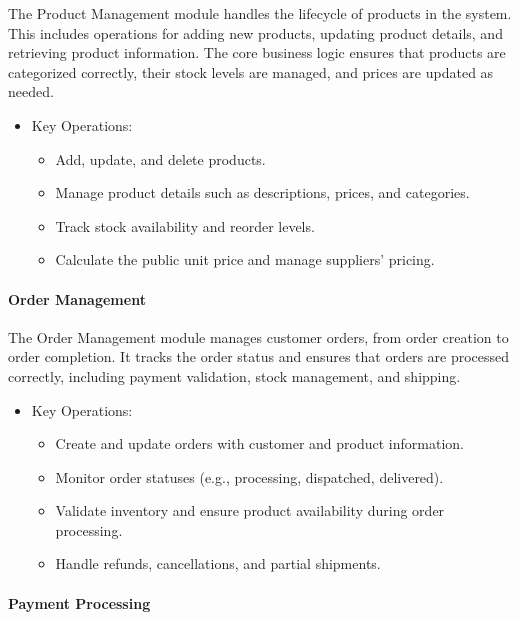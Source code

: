 \documentclass{llncs}
\begin{document}
The Product Management module handles the lifecycle of products in the system. This includes operations for adding new products, updating product details, and retrieving product information. The core business logic ensures that products are categorized correctly, their stock levels are managed, and prices are updated as needed.
    \begin{itemize}
        \item Key Operations:
        \begin{itemize}
        \item Add, update, and delete products.
        \item Manage product details such as descriptions, prices, and categories.
        \item Track stock availability and reorder levels.
        \item Calculate the public unit price and manage suppliers' pricing.
        \end{itemize}   
    \end{itemize}

\paragraph{Order Management} \leavevmode

The Order Management module manages customer orders, from order creation to order completion. It tracks the order status and ensures that orders are processed correctly, including payment validation, stock management, and shipping.
\begin{itemize}
    \item Key Operations:
    \begin{itemize}
    \item Create and update orders with customer and product information.
    \item Monitor order statuses (e.g., processing, dispatched, delivered).
    \item Validate inventory and ensure product availability during order processing.
    \item Handle refunds, cancellations, and partial shipments.
    \end{itemize}   
\end{itemize}

\paragraph{Payment Processing} \leavevmode
\end{document}
